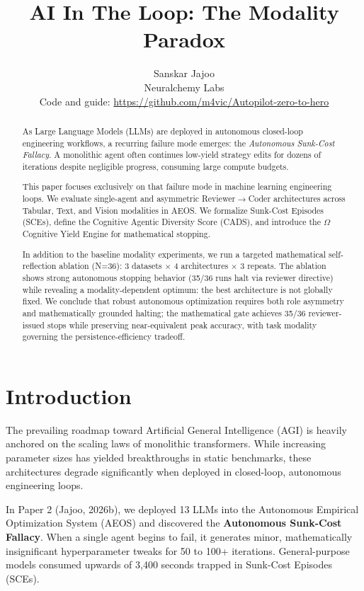 \documentclass[11pt,a4paper]{article}
\title{AI In The Loop: The Modality Paradox}
\author{Sanskar Jajoo \\ Neuralchemy Labs \\ Code and guide: \url{https://github.com/m4vic/Autopilot-zero-to-hero}}
\date{}
\begin{document}
\maketitle

\begin{abstract}
As Large Language Models (LLMs) are deployed in autonomous closed-loop engineering workflows, a recurring failure mode emerges: the \textit{Autonomous Sunk-Cost Fallacy}. A monolithic agent often continues low-yield strategy edits for dozens of iterations despite negligible progress, consuming large compute budgets.

This paper focuses exclusively on that failure mode in machine learning engineering loops. We evaluate single-agent and asymmetric Reviewer$\rightarrow$Coder architectures across Tabular, Text, and Vision modalities in AEOS. We formalize Sunk-Cost Episodes (SCEs), define the Cognitive Agentic Diversity Score (CADS), and introduce the $\Omega$ Cognitive Yield Engine for mathematical stopping.

In addition to the baseline modality experiments, we run a targeted mathematical self-reflection ablation (N=36): 3 datasets $\times$ 4 architectures $\times$ 3 repeats. The ablation shows strong autonomous stopping behavior (35/36 runs halt via reviewer directive) while revealing a modality-dependent optimum: the best architecture is not globally fixed. We conclude that robust autonomous optimization requires both role asymmetry and mathematically grounded halting; the mathematical gate achieves 35/36 reviewer-issued stops while preserving near-equivalent peak accuracy, with task modality governing the persistence-efficiency tradeoff.
\end{abstract}

\section{Introduction}

The prevailing roadmap toward Artificial General Intelligence (AGI) is heavily anchored on the scaling laws of monolithic transformers. While increasing parameter sizes has yielded breakthroughs in static benchmarks, these architectures degrade significantly when deployed in closed-loop, autonomous engineering loops.

In Paper 2 (Jajoo, 2026b), we deployed 13 LLMs into the Autonomous Empirical Optimization System (AEOS) and discovered the \textbf{Autonomous Sunk-Cost Fallacy}. When a single agent begins to fail, it generates minor, mathematically insignificant hyperparameter tweaks for 50 to 100+ iterations. General-purpose models consumed upwards of 3,400 seconds trapped in Sunk-Cost Episodes (SCEs).
\end{document}
